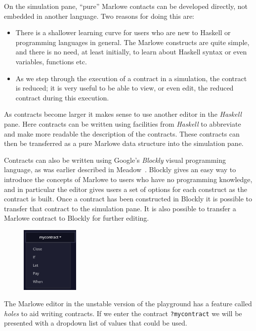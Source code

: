 \documentclass[runningheads]{llncs}
\renewcommand{\lstinline}[1]{\texttt{#1}}
\begin{document}
On the simulation pane, ``pure'' Marlowe contacts can be developed directly, not embedded in another language. Two reasons for doing this are:
\begin{itemize}
    \item There is a shallower learning curve for users who are new to Haskell or programming languages in general. The Marlowe constructs are quite simple, and there is no need, at least initially, to learn about Haskell syntax or even variables, functions etc.
    \item As we step through the execution of a contract in a simulation, the contract is reduced; it is very useful to be able to view, or even edit, the reduced contract during this execution.
\end{itemize}
As contracts become larger it makes sense to use another editor in the \emph{Haskell} pane. Here contracts can be written using facilities from \emph{Haskell} to abbreviate and make more readable the description of the contracts. These contracts can then be transferred as a pure Marlowe data structure into the simulation pane.

Contracts can also be written using Google's \emph{Blockly} visual programming language, as was earlier described in Meadow~\cite{isola-marlowe}. Blockly gives an easy way to introduce the concepts of Marlowe to users who have no programming knowledge, and in particular the editor gives users a set of options for each construct as the contract is built. Once a contract has been constructed in Blockly it is possible to transfer that contract to the simulation pane. It is also possible to transfer a Marlowe contract to Blockly for further editing.

\begin{figure}
    \includegraphics[width=0.25\textwidth]{hole_options.png}
\end{figure}

The Marlowe editor in the unstable version of the playground has a feature called \emph{holes} to aid writing contracts. If we enter the contract \lstinline{?mycontract}
we will be presented with a dropdown list of values that could be used.
\end{document}
